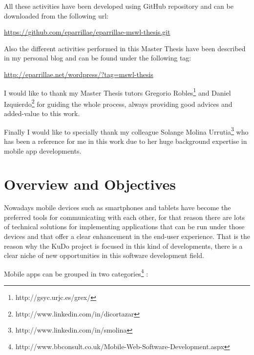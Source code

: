 \documentclass[a4paper,12pt]{book}
\begin{document}
All these activities have been developed using GitHub repository and can be downloaded from the following url:

\url{
https://github.com/eparrillae/eparrillae-mswl-thesis.git}

Also the different activities performed in this Master Thesis have been described in my personal blog and can be found under the following tag:

\url{
http://eparrillae.net/wordpress/?tag=mswl-thesis}

I would like to thank my Master Thesis tutors Gregorio Robles\footnote{http://gsyc.urjc.es/grex/} and Daniel Izquierdo\footnote{http://www.linkedin.com/in/dicortazar} for guiding the whole process, always providing good advices and added-value to this work.

Finally I would like to specially thank my colleague Solange Molina Urrutia\footnote{http://www.linkedin.com/in/smolina} who has been a reference for me in this work due to her huge background expertise in mobile app developments.  


\chapter{Overview and Objectives}
\label{chap:overview}

Nowadays mobile devices such as smartphones and tablets have become the preferred tools for communicating with each other, for that reason there are lots of technical solutions for implementing applications that can be run under those devices and that offer a clear enhancement in the end-user experience. That is the reason why the KuDo project is focused in this kind of developments, there is a clear niche of new opportunities in this software development field.

Mobile apps can be grouped in two categories\footnote{http://www.bbconsult.co.uk/Mobile-Web-Software-Development.aspx} :
\end{document}
